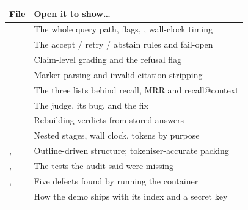 \begin{center}\small
\begin{tabularx}{\textwidth}{@{}>{\raggedright\arraybackslash}p{5.2cm}L@{}}
\toprule
\textbf{File} & \textbf{Open it to show\ldots}\\
\midrule
{} & The whole query path, flags, , wall-clock timing\\
 & The accept / retry / abstain rules and fail-open\\
 & Claim-level grading and the refusal flag\\
 & Marker parsing and invalid-citation stripping\\
 & The three lists behind recall, MRR and recall@context\\
 & The judge, its bug, and the fix\\
 & Rebuilding verdicts from stored answers\\
 & Nested stages, wall clock, tokens by purpose\\
,  & Outline-driven structure; tokeniser-accurate packing\\
,  & The tests the audit said were missing\\
,  & Five defects found by running the container\\
 & How the demo ships with its index and a secret key\\
\bottomrule
\end{tabularx}
\end{center}
